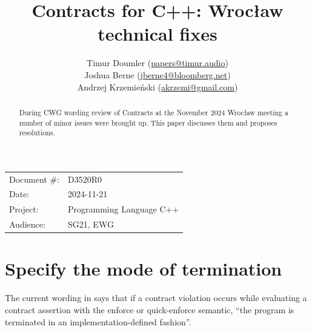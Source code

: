 \title{Contracts for C++: Wroc\l aw technical fixes}
\author{
Timur Doumler \small(\href{mailto:papers@timur.audio}{papers@timur.audio}) \\
Joshua Berne \small(\href{mailto:jberne4@bloomberg.net}{jberne4@bloomberg.net}) \\
Andrzej Krzemie\' nski \small(\href{mailto:akrzemi@gmail.com}{akrzemi@gmail.com}) \\
}
\date{}
\maketitle

\begin{tabular}{ll}
Document \#: & D3520R0 \\
Date: &2024-11-21 \\
Project: & Programming Language C++ \\
Audience: & SG21, EWG
\end{tabular}

\begin{abstract}
During CWG wording review of Contracts \cite{P2900R11} at the November 2024 Wroc\l aw meeting a number of minor issues were brought up. This paper discusses them and proposes resolutions.
\end{abstract}







\section{Specify the mode of termination}

The current wording in \cite{P2900R11} says that if a contract violation occurs while evaluating a contract assertion with the enforce or quick-enforce semantic, ``the program is terminated in an implementation-defined fashion''.

